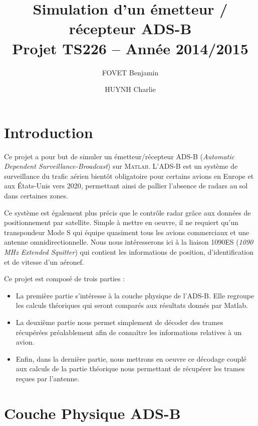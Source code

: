 \documentclass[a4paper, 10pt]{article}
\title{\textbf{Simulation d'un émetteur / récepteur ADS-B}\\Projet TS226 -- Année 2014/2015}
\author{FOVET Benjamin \and HUYNH Charlie}
\date{}
\begin{document}
\maketitle
\tableofcontents
\part*{Introduction}
 
Ce projet a pour but de simuler un émetteur/récepteur ADS-B (\textit{Automatic Dependent Surveillance-Broadcast}) sur M\textsc{atlab}. L'ADS-B est un système de surveillance du trafic aérien bientôt obligatoire pour certains avions en Europe et aux États-Unis vers 2020, permettant ainsi de pallier l'absence de radars au sol dans certaines zones.

\vspace{5pt}
Ce système est également plus précis que le contrôle radar grâce aux données de positionnement par satellite. Simple à mettre en oeuvre, il ne requiert qu'un transpondeur Mode S qui équipe quasiment tous les avions commerciaux et une antenne omnidirectionnelle. Nous nous intéresserons ici à la liaison 1090ES (\textit{1090 MHz Extended Squitter}) qui contient les informations de position, d'identification et de vitesse d'un aéronef. %

\vspace{5pt}
Ce projet est composé de trois parties :
\begin{itemize}
\item La première partie s'intéresse à la couche physique de l'ADS-B. Elle regroupe les calculs théoriques qui seront comparés aux résultats donnés par Matlab.
\item La deuxième partie nous permet simplement de décoder des trames récupérées préalablement afin de connaître les informations relatives à un avion.
\item Enfin, dans la dernière partie, nous mettrons en oeuvre ce décodage couplé aux calculs de la partie théorique nous permettant de récupérer les trames reçues par l'antenne.
\end{itemize}

\part{Couche Physique ADS-B}
    \setcounter{section}{1}
    \setcounter{subsection}{0}
    
\end{document}
